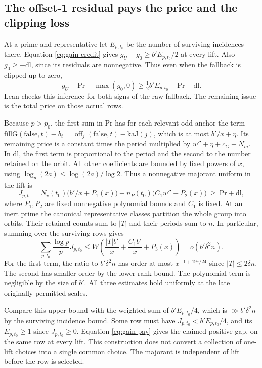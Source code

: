 \documentclass[12pt,letterpaper]{article}
\begin{document}
\subsection{The offset-1 residual pays the price and the clipping loss}

At a prime and representative let \(E_{p,t_0}\) be the number of surviving incidences there. Equation \eqref{eq:gain-credit} gives \(g_U-g_0\ge b'E_{p,t_0}/2\) at every lift. Also \(g_0\ge-\mathrm{dl}\), since its residuals are nonnegative. Thus even when the fallback is clipped up to zero,
\begin{equation}
 g_U-\mathrm{Pr}-\max(g_0,0)
      \ge \tfrac12 b'E_{p,t_0}-\mathrm{Pr}-\mathrm{dl}.
 \label{eq:gain-pay}
\end{equation}
Lean checks this inference for both signs of the raw fallback. The remaining issue is the total price on those actual rows.

Because \(p>p_0\), the first sum in \(\mathrm{Pr}\) has for each relevant odd anchor the term \(\mathrm{fillG}(\mathrm{false},t)-b_t=\operatorname{off}_j(\mathrm{false},t)-\mathrm{kaJ}(j)\), which is at most \(b'/x+\eta\). Its remaining price is a constant times the period multiplied by \(w''+\eta+c_G+N_m\). In \(\mathrm{dl}\), the first term is proportional to the period and the second to the number retained on the orbit. All other coefficients are bounded by fixed powers of \(x\), using \(\log_p(2a)\le\log(2a)/\log 2\). Thus a nonnegative majorant uniform in the lift is
\[
 J_{p,t_0}=N_v(t_0)\bigl(b'/x+P_1(x)\bigr)
     +n_P(t_0)\bigl(C_1w''+P_2(x)\bigr)\ \ge\ \mathrm{Pr}+\mathrm{dl},
\]
where \(P_1,P_2\) are fixed nonnegative polynomial bounds and \(C_1\) is fixed. At an inert prime the canonical representative classes partition the whole group into orbits. Their retained counts sum to \(|T|\) and their periods sum to \(n\). In particular, summing over the surviving rows gives
\[
 \sum_{p,t_0}\frac{\log p}{p}J_{p,t_0}
    \le W\left(\frac{|T|b'}x+\frac{C_1b'}x+P_3(x)\right)
    = o(b'\delta^2n).
\]
For the first term, the ratio to \(b'\delta^2n\) has order at most \(x^{-1+19\varepsilon/24}\) since \(|T|\le2\delta n\). The second has smaller order by the lower rank bound. The polynomial term is negligible by the size of \(b'\). All three estimates hold uniformly at the late originally permitted scales.

Compare this upper bound with the weighted sum of \(b'E_{p,t_0}/4\), which is \(\gg b'\delta^2 n\) by the surviving incidence bound. Some row must have \(J_{p,t_0}<b'E_{p,t_0}/4\), and its \(E_{p,t_0}\ge1\) since \(J_{p,t_0}\ge0\). Equation \eqref{eq:gain-pay} gives the claimed positive gap, on the same row at every lift. This construction does not convert a collection of one-lift choices into a single common choice. The majorant is independent of lift before the row is selected.
\end{document}
